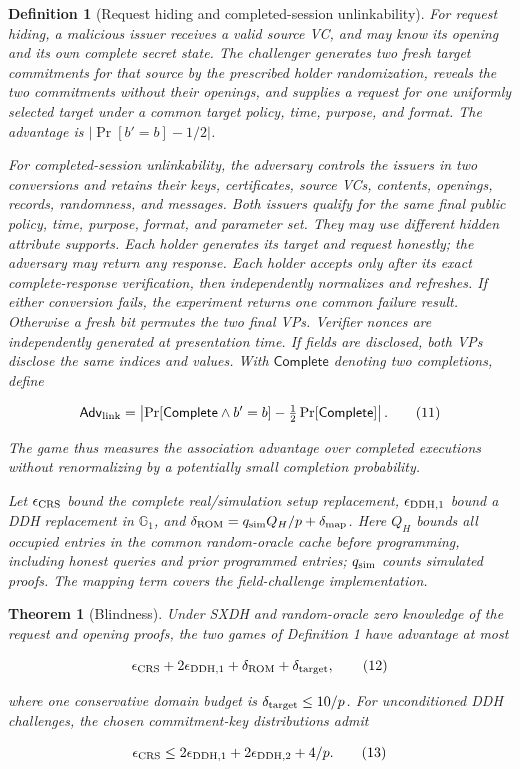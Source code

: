 \documentclass[11pt]{article}
\newtheorem{definition}{Definition}
\newtheorem{theorem}{Theorem}
\begin{document}
\begin{definition}[Request hiding and completed-session unlinkability]
For request hiding, a malicious issuer receives a valid source VC, and may know its opening and its own complete secret state. The challenger generates two fresh target commitments for that source by the prescribed holder randomization, reveals the two commitments without their openings, and supplies a request for one uniformly selected target under a common target policy, time, purpose, and format. The advantage is \(\left|\Pr[b'=b]-1/2\right|\).

For completed-session unlinkability, the adversary controls the issuers in two conversions and retains their keys, certificates, source VCs, contents, openings, records, randomness, and messages. Both issuers qualify for the same final public policy, time, purpose, format, and parameter set. They may use different hidden attribute supports. Each holder generates its target and request honestly; the adversary may return any response. Each holder accepts only after its exact complete-response verification, then independently normalizes and refreshes. If either conversion fails, the experiment returns one common failure result. Otherwise a fresh bit permutes the two final VPs. Verifier nonces are independently generated at presentation time. If fields are disclosed, both VPs disclose the same indices and values. With \(\mathsf{Complete}\) denoting two completions, define

\[
\mathsf{Adv}_{\rm link}
=\left|\Pr[\mathsf{Complete}\land b'=b]
-\tfrac12\Pr[\mathsf{Complete}]\right|.
\tag{11}
\]

The game thus measures the association advantage over completed executions without renormalizing by a potentially small completion probability.

Let \(\epsilon_{\rm CRS}\) bound the complete real/simulation setup replacement, \(\epsilon_{\rm DDH,1}\) bound a DDH replacement in \(\mathbb G_1\), and \(\delta_{\rm ROM}=q_{\rm sim}Q_H/p+\delta_{\rm map}\). Here \(Q_H\) bounds all occupied entries in the common random-oracle cache before programming, including honest queries and prior programmed entries; \(q_{\rm sim}\) counts simulated proofs. The mapping term covers the field-challenge implementation.

\end{definition}
\begin{theorem}[Blindness]
Under SXDH and random-oracle zero knowledge of the request and opening proofs, the two games of Definition 1 have advantage at most

\[
\epsilon_{\rm CRS}+2\epsilon_{\rm DDH,1}
+\delta_{\rm ROM}+\delta_{\rm target},
\tag{12}
\]

where one conservative domain budget is \(\delta_{\rm target}\le10/p\). For unconditioned DDH challenges, the chosen commitment-key distributions admit

\[
\epsilon_{\rm CRS}\le
2\epsilon_{\rm DDH,1}+2\epsilon_{\rm DDH,2}+4/p.
\tag{13}
\]

\end{theorem}
\end{document}

